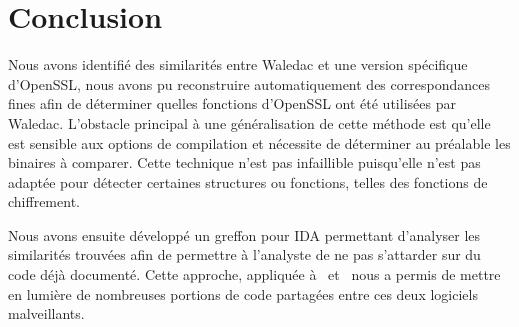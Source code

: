 \section*{Conclusion}
Nous avons identifié des similarités entre Waledac et une version spécifique d'OpenSSL, nous avons pu reconstruire automatiquement des correspondances fines afin de déterminer quelles fonctions d'OpenSSL ont été utilisées par Waledac.
L'obstacle principal à une généralisation de cette méthode est qu'elle est sensible aux options de compilation et nécessite de déterminer au préalable les binaires à comparer.
Cette technique n'est pas infaillible puisqu'elle n'est pas adaptée pour détecter certaines structures ou fonctions, telles des fonctions de chiffrement.

Nous avons ensuite développé un greffon pour IDA permettant d'analyser les similarités trouvées afin de permettre à l'analyste de ne pas s'attarder sur du code déjà documenté.
Cette approche, appliquée à \duqu\ et \stux\ nous a permis de mettre en lumière de nombreuses portions de code partagées entre ces deux logiciels malveillants.